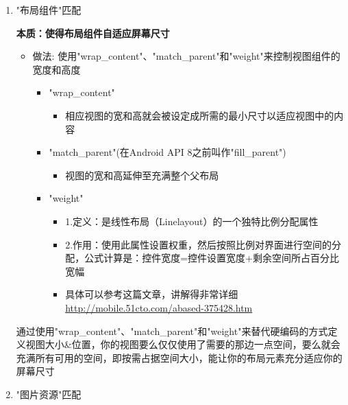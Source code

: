 \documentclass[9pt, b5paper]{article}
\begin{document}
\begin{enumerate}
\item "布局组件"匹配
\label{sec-1-6-1-2}

\textbf{本质：使得布局组件自适应屏幕尺寸}
\begin{itemize}
\item 做法: 使用"wrap\_content"、"match\_parent"和"weight"来控制视图组件的宽度和高度
\begin{itemize}
\item "wrap\_content"
\begin{itemize}
\item 相应视图的宽和高就会被设定成所需的最小尺寸以适应视图中的内容
\end{itemize}
\item "match\_parent"(在Android API 8之前叫作"fill\_parent")
\begin{itemize}
\item 视图的宽和高延伸至充满整个父布局
\end{itemize}
\item "weight"
\begin{itemize}
\item 1.定义：是线性布局（Linelayout）的一个独特比例分配属性
\item 2.作用：使用此属性设置权重，然后按照比例对界面进行空间的分配，公式计算是：控件宽度=控件设置宽度+剩余空间所占百分比宽幅
\item 具体可以参考这篇文章，讲解得非常详细 \url{http://mobile.51cto.com/abased-375428.htm}
\end{itemize}
\end{itemize}
\end{itemize}

通过使用"wrap\_content"、"match\_parent"和"weight"来替代硬编码的方式定义视图大小\&位置，你的视图要么仅仅使用了需要的那边一点空间，要么就会充满所有可用的空间，即按需占据空间大小，能让你的布局元素充分适应你的屏幕尺寸

\item "图片资源"匹配
\label{sec-1-6-1-3}


\end{enumerate}
\end{document}
